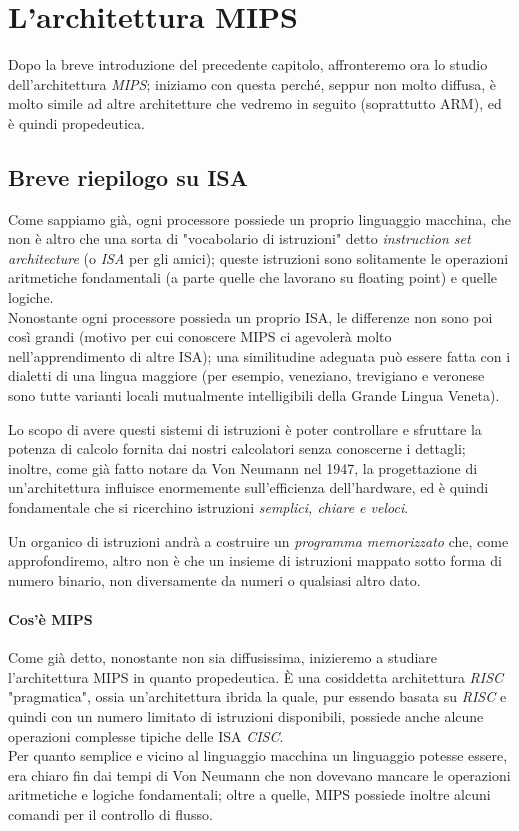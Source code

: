 \documentclass[class=book, crop=false, oneside]{standalone}
\begin{document}
\chapter{L'architettura MIPS}

Dopo la breve introduzione del precedente capitolo, affronteremo ora lo studio dell'architettura \emph{MIPS}; iniziamo con questa perché, seppur non molto diffusa, è molto simile ad altre architetture che vedremo in seguito (soprattutto ARM), ed è quindi propedeutica.

\section{Breve riepilogo su ISA}
Come sappiamo già, ogni processore possiede un proprio linguaggio macchina, che non è altro che una sorta di "vocabolario di istruzioni" detto \emph{instruction set architecture} (o \emph{ISA} per gli amici); queste istruzioni sono solitamente le operazioni aritmetiche fondamentali (a parte quelle che lavorano su floating point) e quelle logiche.\\
Nonostante ogni processore possieda un proprio ISA, le differenze non sono poi così grandi (motivo per cui conoscere MIPS ci agevolerà molto nell'apprendimento di altre ISA); una similitudine adeguata può essere fatta con i dialetti di una lingua maggiore (per esempio, veneziano, trevigiano e veronese sono tutte varianti locali mutualmente intelligibili della Grande Lingua Veneta).

Lo scopo di avere questi sistemi di istruzioni è poter controllare e sfruttare la potenza di calcolo fornita dai nostri calcolatori senza conoscerne i dettagli; inoltre, come già fatto notare da Von Neumann nel 1947, la progettazione di un'architettura influisce enormemente sull'efficienza dell'hardware, ed è quindi fondamentale che si ricerchino istruzioni \emph{semplici, chiare e veloci}.

Un organico di istruzioni andrà a costruire un \emph{programma memorizzato} che, come approfondiremo, altro non è che un insieme di istruzioni mappato sotto forma di numero binario, non diversamente da numeri o qualsiasi altro dato.

\subsubsection{Cos'è MIPS}
Come già detto, nonostante non sia diffusissima, inizieremo a studiare l'architettura MIPS in quanto propedeutica. È una cosiddetta architettura \emph{RISC} "pragmatica", ossia un'architettura ibrida la quale, pur essendo basata su \emph{RISC} e quindi con un numero limitato di istruzioni disponibili, possiede anche alcune operazioni complesse tipiche delle ISA \emph{CISC}.\\
Per quanto semplice e vicino al linguaggio macchina un linguaggio potesse essere, era chiaro fin dai tempi di Von Neumann che non dovevano mancare le operazioni aritmetiche e logiche fondamentali; oltre a quelle, MIPS possiede inoltre alcuni comandi per il controllo di flusso.
\end{document}
